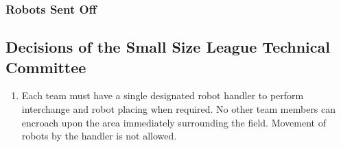 \ifdiff
\subsubsection{Robots Sent Off}
\fi

\subsection*{Decisions of the Small Size League Technical Committee}
\begin{enumerate}
\item
Each team must have a single designated robot handler to perform interchange and robot placing when required.
No other team members can encroach upon the area immediately surrounding the field.
Movement of robots by the handler is not allowed.
\end{enumerate}

